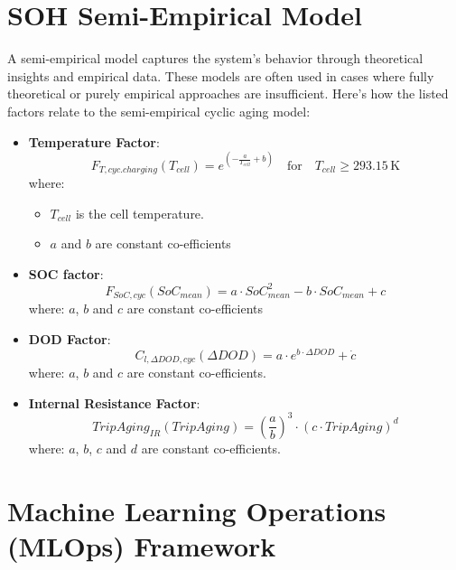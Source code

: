 \section{SOH Semi-Empirical Model}
A semi-empirical model captures the system's behavior through theoretical insights and empirical data. These models are often used in cases where fully theoretical or purely empirical approaches are insufficient. Here’s how the listed factors relate to the semi-empirical cyclic aging model:

\begin{itemize}
    \item \textbf{Temperature Factor}:
    \begin{equation}
        F_{T,cyc.charging}(T_{cell}) = e^{\left(-\frac{a}{T_{cell}} + b\right)} \quad \text{for} \quad T_{cell} \geq 293.15 \, \text{K}
    \end{equation}
    where:
    \begin{itemize}
        \item $T_{cell}$ is the cell temperature.
        \item $a$ and $b$ are constant co-efficients
    \end{itemize}

    \item \textbf{SOC factor}: 
    \begin{equation}
        F_{SoC,cyc}(SoC_{mean}) = a \cdot SoC_{mean}^2 - b \cdot SoC_{mean} + c
    \end{equation}
    where:
    $a$, $b$ and $c$ are constant co-efficients

    \item \textbf{DOD Factor}:
    \begin{equation}
        C_{l,\Delta DOD,cyc}(\Delta DOD) = a \cdot e^{b \cdot \Delta DOD} + \dot{c}
    \end{equation}
    where: 
    $a$, $b$ and $c$ are constant co-efficients.

    \item \textbf{Internal Resistance Factor}:
    \begin{equation}
        TripAging_{IR}(TripAging) = \left(\frac{a}{b}\right)^3 \cdot (c \cdot TripAging)^d
    \end{equation}
    where:
    $a$, $b$, $c$ and $d$ are constant co-efficients.
\end{itemize}

\section{Machine Learning Operations (MLOps) Framework}
\label{MLOPS}  

